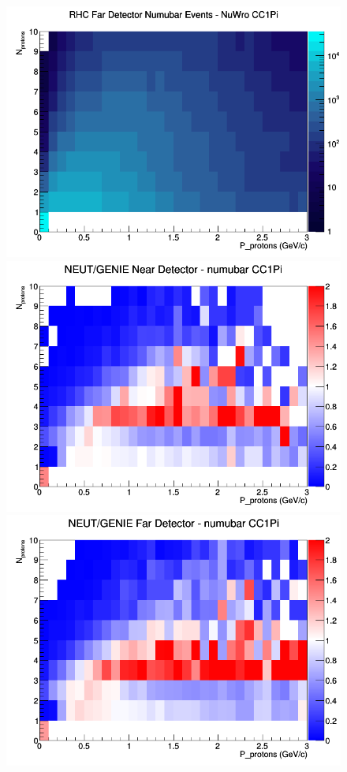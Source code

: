 \documentclass[12pt]{article}
\begin{document}
\begin{figure}[h]
\endminipage
{}
\includegraphics[width=\linewidth]{N_P/nominal/protons/CC1Pi_RHC_FD_numubar_N_P_NuWro.png}
\endminipage
\newline
{}
\includegraphics[width=\linewidth]{N_P/nominal/protons/ratios/CC1Pi_NEUT_GENIE_numubar_near_N_P.png}
\endminipage
{}
\includegraphics[width=\linewidth]{N_P/nominal/protons/ratios/CC1Pi_NEUT_GENIE_numubar_far_N_P.png}

\end{figure}
\end{document}
